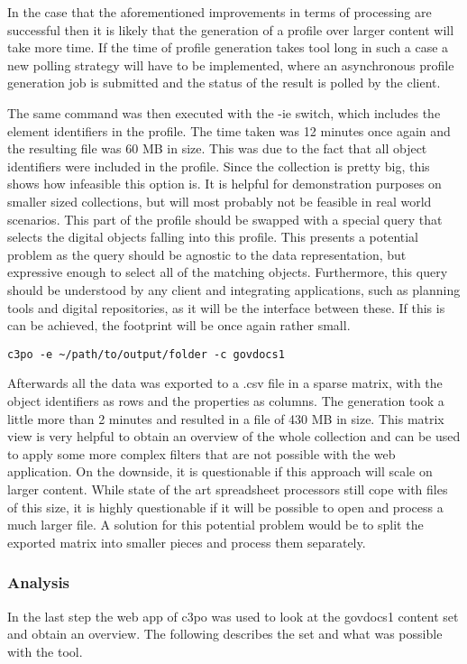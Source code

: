 In the case that the aforementioned improvements in terms of processing are successful then it is likely that the generation of a profile over larger content will take more time. If the time of profile generation takes tool long in such a case a new polling strategy will have to be implemented, where an asynchronous profile generation job is submitted and the status of the result is polled by the client.

The same command was then executed with the -ie switch, which includes the element identifiers in the profile.
The time taken was 12 minutes once again and the resulting file was 60 MB in size. This was due to the fact that all object identifiers were included in the profile. Since the collection is pretty big, this shows how infeasible this option is. It is helpful for demonstration purposes on smaller sized collections, but will most probably not be feasible in real world scenarios. This part of the profile should be swapped with a special query that selects the digital objects falling into this profile. This presents a potential problem as the query should be agnostic to the data representation, but expressive enough to select all of the matching objects. Furthermore, this query should be understood by any client and integrating applications, such as planning tools and digital repositories, as it will be the interface between these. If this is can be achieved, the footprint will be once again rather small. 


\begin{verbatim}
c3po -e ~/path/to/output/folder -c govdocs1
\end{verbatim}
Afterwards all the data was exported to a .csv file in a sparse matrix, with the object identifiers as rows and the properties as columns. The generation took a little more than 2 minutes and resulted in a file of 430 MB in size. This matrix view is very helpful to obtain an overview of the whole collection and can be used to apply some more complex filters that are not possible with the web application. On the downside, it is questionable if this approach will scale on larger content. While state of the art spreadsheet processors still cope with files of this size, it is highly questionable if it will be possible to open and process a much larger file. A solution for this potential problem would be to split the exported matrix into smaller pieces and process them separately.

\subsubsection{Analysis}
In the last step the web app of c3po was used to look at the govdocs1 content set and obtain an overview. The following describes the set and what was possible with the tool.

